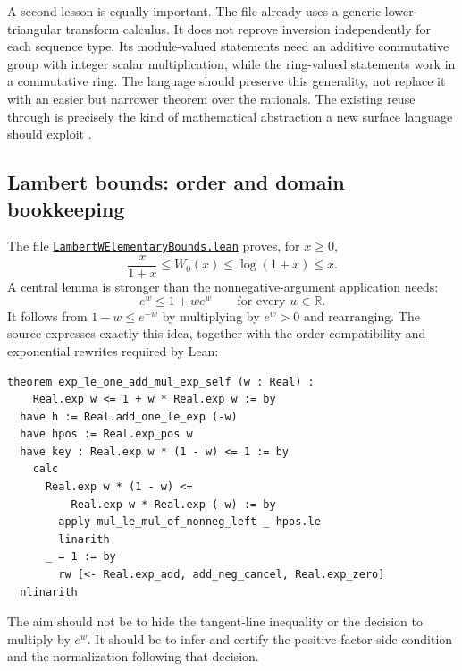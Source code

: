 \documentclass[11pt,a4paper]{article}
\newcommand{\code}[1]{\texttt{\detokenize{#1}}}
\newcommand{\R}{\mathbb R}
\newcommand{\pfile}[1]{\href{https://github.com/VladimirReshetnikov/ProveIt/blob/24ce8bd743eaab64a91ce90725ea00f498d319d2/Analysis/FabiusFunction/Lean/FabiusFunction/#1}{\nolinkurl{#1}}}
\theoremstyle{remark}
\begin{document}
A second lesson is equally important. The file already uses a generic lower-triangular transform calculus. It does not reprove inversion independently for each sequence type. Its module-valued statements need an additive commutative group with integer scalar multiplication, while the ring-valued statements work in a commutative ring. The language should preserve this generality, not replace it with an easier but narrower theorem over the rationals. The existing reuse through
\code{lowerTriangular_orthogonal_comm}
is precisely the kind of mathematical abstraction a new surface language should exploit \cite{proveit}.

\subsection{Lambert bounds: order and domain bookkeeping}
The file \pfile{LambertWElementaryBounds.lean} proves, for $x\geq0$,
\begin{equation}
\frac{x}{1+x}\leq W_0(x)\leq\log(1+x)\leq x.
\label{eq:lambert-chain}
\end{equation}
A central lemma is stronger than the nonnegative-argument application needs:
\begin{equation}
e^w\leq 1+we^w\qquad\text{for every }w\in\R.
\label{eq:exp-core}
\end{equation}
It follows from $1-w\leq e^{-w}$ by multiplying by $e^w>0$ and rearranging. The source expresses exactly this idea, together with the order-compatibility and exponential rewrites required by Lean:
\par\noindent\begin{minipage}{\linewidth}
\begin{lstlisting}[caption={Existing Lean proof, with ASCII relation and type spellings.}]
theorem exp_le_one_add_mul_exp_self (w : Real) :
    Real.exp w <= 1 + w * Real.exp w := by
  have h := Real.add_one_le_exp (-w)
  have hpos := Real.exp_pos w
  have key : Real.exp w * (1 - w) <= 1 := by
    calc
      Real.exp w * (1 - w) <=
          Real.exp w * Real.exp (-w) := by
        apply mul_le_mul_of_nonneg_left _ hpos.le
        linarith
      _ = 1 := by
        rw [<- Real.exp_add, add_neg_cancel, Real.exp_zero]
  nlinarith
\end{lstlisting}
\end{minipage}\par
The aim should not be to hide the tangent-line inequality or the decision to multiply by $e^w$. It should be to infer and certify the positive-factor side condition and the normalization following that decision.
\end{document}
